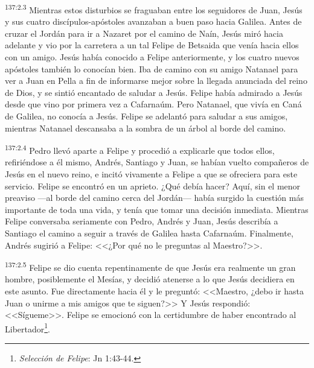 \par 
\textsuperscript{137:2.3} Mientras estos disturbios se fraguaban entre los seguidores de Juan, Jesús y sus cuatro discípulos-apóstoles avanzaban a buen paso hacia Galilea. Antes de cruzar el Jordán para ir a Nazaret por el camino de Naín, Jesús miró hacia adelante y vio por la carretera a un tal Felipe de Betsaida que venía hacia ellos con un amigo. Jesús había conocido a Felipe anteriormente, y los cuatro nuevos apóstoles también lo conocían bien. Iba de camino con su amigo Natanael para ver a Juan en Pella a fin de informarse mejor sobre la llegada anunciada del reino de Dios, y se sintió encantado de saludar a Jesús. Felipe había admirado a Jesús desde que vino por primera vez a Cafarnaúm. Pero Natanael, que vivía en Caná de Galilea, no conocía a Jesús. Felipe se adelantó para saludar a sus amigos, mientras Natanael descansaba a la sombra de un árbol al borde del camino.

\par 
\textsuperscript{137:2.4} Pedro llevó aparte a Felipe y procedió a explicarle que todos ellos, refiriéndose a él mismo, Andrés, Santiago y Juan, se habían vuelto compañeros de Jesús en el nuevo reino, e incitó vivamente a Felipe a que se ofreciera para este servicio. Felipe se encontró en un aprieto. ¿Qué debía hacer? Aquí, sin el menor preaviso ---al borde del camino cerca del Jordán--- había surgido la cuestión más importante de toda una vida, y tenía que tomar una decisión inmediata. Mientras Felipe conversaba seriamente con Pedro, Andrés y Juan, Jesús describía a Santiago el camino a seguir a través de Galilea hasta Cafarnaúm. Finalmente, Andrés sugirió a Felipe: <<¿Por qué no le preguntas al Maestro?>>.

\par 
\textsuperscript{137:2.5} Felipe se dio cuenta repentinamente de que Jesús era realmente un gran hombre, posiblemente el Mesías, y decidió atenerse a lo que Jesús decidiera en este asunto. Fue directamente hacia él y le preguntó: <<Maestro, ¿debo ir hasta Juan o unirme a mis amigos que te siguen?>> Y Jesús respondió: <<Sígueme>>. Felipe se emocionó con la certidumbre de haber encontrado al Libertador\footnote{\textit{Selección de Felipe}: Jn 1:43-44.}.

